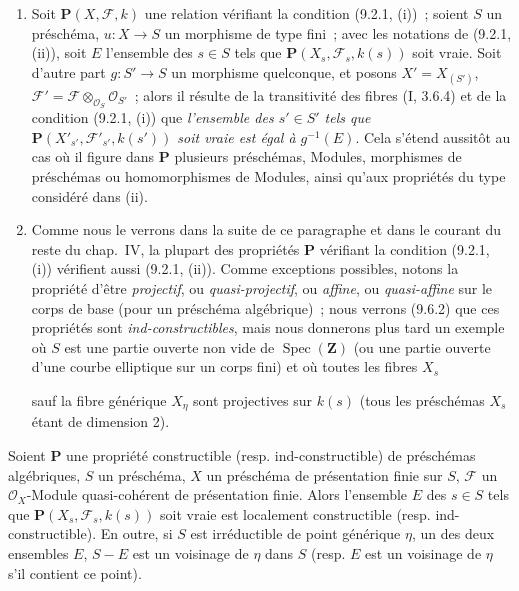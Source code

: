 \begin{remarks}[9.2.2]
\begin{enumerate}[label=(\roman*)]
  \item Soit $\mathbf P(X,\mathcal F,k)$ une relation vérifiant la condition
  (9.2.1, (i))~; soient $S$ un préschéma, $u:X\to S$ un morphisme de type
  fini~; avec les notations de (9.2.1, (ii)), soit $E$ l'ensemble des $s\in S$
  tels que $\mathbf P(X_s,\mathcal F_s,k(s))$ soit vraie. Soit d'autre part
  $g:S'\to S$ un morphisme quelconque, et posons
  $X'=X_{(S')}$, $\mathcal F'=\mathcal F\otimes_{\mathcal O_S}\mathcal O_{S'}$~;
  alors il résulte de la transitivité des fibres (I, 3.6.4) et de la condition
  (9.2.1, (i)) que \emph{l'ensemble des $s'\in S'$ tels que
  $\mathbf P(X'_{s'},\mathcal F'_{s'},k(s'))$ soit vraie est égal à
  $g^{-1}(E)$}. Cela s'étend aussitôt au cas où il figure dans $\mathbf P$
  plusieurs préschémas, Modules, morphismes de préschémas ou homomorphismes de
  Modules, ainsi qu'aux propriétés du type considéré dans (ii).

  \item Comme nous le verrons dans la suite de ce paragraphe et dans le courant
  du reste du chap.~IV, la plupart des propriétés $\mathbf P$ vérifiant la
  condition (9.2.1, (i)) vérifient aussi (9.2.1, (ii)). Comme exceptions
  possibles, notons la propriété d'être \emph{projectif}, ou
  \emph{quasi-projectif}, ou \emph{affine}, ou \emph{quasi-affine} sur le
  corps de base (pour un préschéma algébrique)~; nous verrons (9.6.2) que ces
  propriétés sont \emph{ind-constructibles}, mais nous donnerons plus tard un
  exemple où $S$ est une partie ouverte non vide de $\operatorname{Spec}(\mathbf Z)$
  (ou une partie ouverte d'une courbe elliptique sur un corps fini) et où
  toutes les fibres $X_s$

  sauf la fibre générique $X_\eta$ sont projectives sur $k(s)$ (tous les
  préschémas $X_s$ étant de dimension 2).
\end{enumerate}
\end{remarks}

\begin{proposition}[9.2.3]
\label{IV.9.2.3-fr}
Soient $\mathbf P$ une propriété constructible (resp. ind-constructible) de
préschémas algébriques, $S$ un préschéma, $X$ un préschéma de présentation
finie sur $S$, $\mathcal F$ un $\mathcal O_X$-Module quasi-cohérent de
présentation finie. Alors l'ensemble $E$ des $s\in S$ tels que
$\mathbf P(X_s,\mathcal F_s,k(s))$ soit vraie est localement constructible
(resp. ind-constructible). En outre, si $S$ est irréductible de point générique
$\eta$, un des deux ensembles $E$, $S-E$ est un voisinage de $\eta$ dans $S$
(resp. $E$ est un voisinage de $\eta$ s'il contient ce point).
\end{proposition}

